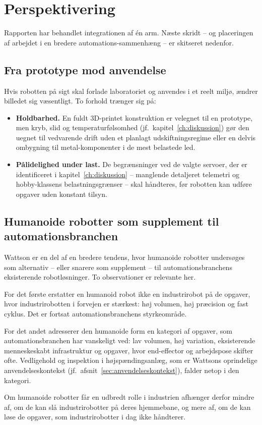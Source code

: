 \chapter{Perspektivering}
\label{ch:perspektivering}


Rapporten har behandlet integrationen af én arm. Næste skridt --
og placeringen af arbejdet i en bredere automations-sammenhæng --
er skitseret nedenfor.

\section{Fra prototype mod anvendelse}

Hvis robotten på sigt skal forlade laboratoriet og anvendes i et reelt miljø,
ændrer billedet sig væsentligt. To forhold trænger sig på:
\begin{itemize}
    \item \textbf{Holdbarhed.} En fuldt 3D-printet konstruktion er velegnet
          til en prototype, men kryb, slid og temperaturfølsomhed (jf.\
          kapitel~\ref{ch:diskussion}) gør den uegnet til vedvarende drift
          uden et planlagt udskiftningsregime eller en delvis ombygning til
          metal-komponenter i de mest belastede led.
    \item \textbf{Pålidelighed under last.} De begrænsninger ved de valgte
          servoer, der er identificeret i kapitel~\ref{ch:diskussion} --
          manglende detaljeret telemetri og hobby-klassens belastningsgrænser
          -- skal håndteres, før robotten kan udføre opgaver uden konstant
          tilsyn.
\end{itemize}

\clearpage
\section{Humanoide robotter som supplement til automationsbranchen}

Wattson er en del af en bredere tendens, hvor humanoide robotter undersøges
som alternativ -- eller snarere som supplement -- til automationsbranchens
eksisterende robotløsninger.
To observationer er relevante her.

For det første erstatter en humanoid robot ikke en industrirobot på de
opgaver, hvor industrirobotten i forvejen er stærkest: høj volumen, høj
præcision og fast cyklus. Det er fortsat automationsbranchens
styrkeområde.

For det andet adresserer den humanoide form en kategori af opgaver, som
automationsbranchen har vanskeligt ved: lav volumen, høj variation,
eksisterende menneskeskabt infrastruktur og opgaver, hvor end-effector og
arbejdspose skifter ofte. Vedligehold og inspektion i højspændingsanlæg,
som er Wattsons oprindelige anvendelseskontekst (jf.\
afsnit~\ref{sec:anvendelseskontekst}), falder netop i den kategori.

Om humanoide robotter får en udbredt rolle i industrien afhænger derfor
mindre af, om de kan slå industrirobotter på deres hjemmebane, og mere af,
om de kan løse de opgaver, som industrirobotter i dag ikke håndterer.
